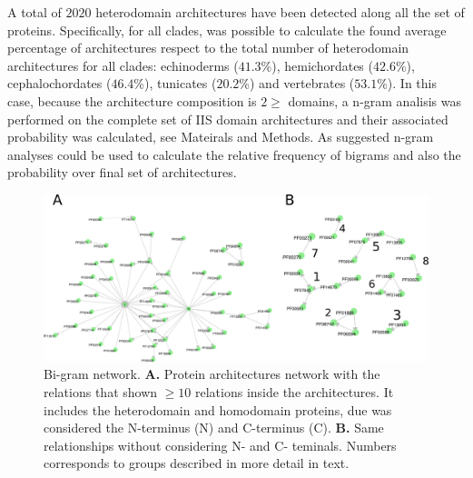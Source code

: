 \documentclass[11pt]{article}
\begin{document}


A total of $2020$ heterodomain architectures have been detected along all
the set of proteins. Specifically, for all clades, was possible to calculate 
the found average percentage of architectures respect to the total number of 
heterodomain architectures for all clades: echinoderms ($41.3$\%), 
hemichordates ($42.6$\%), cephalochordates ($46.4$\%), tunicates 
($20.2$\%) and vertebrates ($53.1$\%). In this case, because the architecture
composition is $2 \geq$ domains, a n-gram analisis was performed on the complete set of 
IIS domain architectures and their associated probability was calculated, see
Mateirals and Methods. 
As suggested \cite{Yu:2019} n-gram analyses could be used to calculate the
relative frequency of bigrams and also the probability over final set of
architectures.

\begin{figure}[ht!]
  \centering
  \includegraphics[scale=0.12]{figures/bigramsFinal}
  \caption{Bi-gram network. \textbf{A.} Protein architectures network with the
    relations that shown $\geq 10$ relations inside the architectures. It
    includes the heterodomain and homodomain proteins, due was considered
  the N-terminus (N) and C-terminus (C). \textbf{B.} Same relationships without
 considering N- and C- teminals. Numbers corresponds to groups described in more
 detail in text.}\label{fig:bigramNet}
\end{figure}
\end{document}

